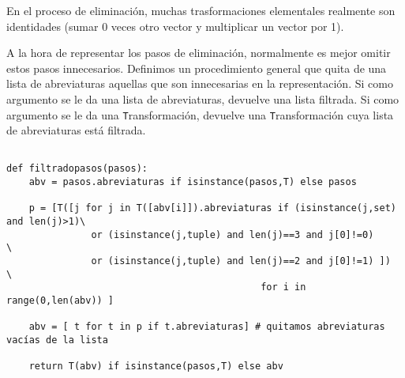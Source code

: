 \documentclass[11pt]{report}
\begin{document}
En el proceso de eliminación, muchas trasformaciones elementales
realmente son identidades (sumar 0 veces otro vector y multiplicar un
vector por 1).

A la hora de representar los pasos de eliminación, normalmente es
mejor omitir estos pasos innecesarios. Definimos un procedimiento
general que quita de una lista de abreviaturas aquellas que son
innecesarias en la representación. Si como argumento se le da una
lista de abreviaturas, devuelve una lista filtrada. Si como argumento
se le da una \texttt{T}ransformación, devuelve una
\texttt{T}ransformación cuya lista de abreviaturas está filtrada.

\begin{verbatim}

def filtradopasos(pasos):
    abv = pasos.abreviaturas if isinstance(pasos,T) else pasos
           
    p = [T([j for j in T([abv[i]]).abreviaturas if (isinstance(j,set) and len(j)>1)\
               or (isinstance(j,tuple) and len(j)==3 and j[0]!=0)       \
               or (isinstance(j,tuple) and len(j)==2 and j[0]!=1) ])    \
                                             for i in range(0,len(abv)) ]

    abv = [ t for t in p if t.abreviaturas] # quitamos abreviaturas vacías de la lista
    
    return T(abv) if isinstance(pasos,T) else abv

\end{verbatim}
\end{document}
